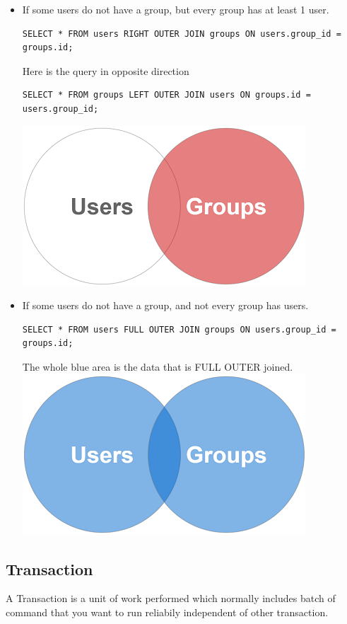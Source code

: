 \documentclass[a4paper]{article}
\begin{document}
\begin{itemize}
\item If some users do not have a group, but every group has at least 1 user.
\begin{lstlisting}
SELECT * FROM users RIGHT OUTER JOIN groups ON users.group_id = groups.id;
\end{lstlisting}
Here is the query in opposite direction
\begin{lstlisting}
SELECT * FROM groups LEFT OUTER JOIN users ON groups.id = users.group_id;
\end{lstlisting}
\includegraphics{img/right_outer_join.png}
\end{itemize}


\begin{itemize}
\item If some users do not have a group, and not every group has users.
\begin{lstlisting}
SELECT * FROM users FULL OUTER JOIN groups ON users.group_id = groups.id;
\end{lstlisting}
The whole blue area is the data that is FULL OUTER joined.\\
\includegraphics{img/full_outer_join.png}
\end{itemize}


\subsection{Transaction}
A Transaction is a unit of work performed which normally includes batch of command that you want to run reliabily independent of other transaction.
\end{document}
